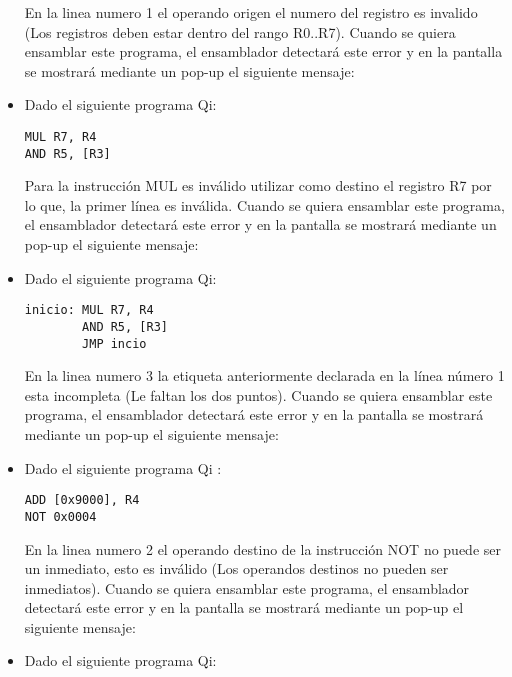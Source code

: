 \begin{itemize}
En la linea numero 1 el operando origen el numero del registro es invalido (Los registros deben estar dentro del rango R0..R7). Cuando se quiera ensamblar este programa, el ensamblador detectará este error y en la pantalla se mostrará mediante un pop-up el siguiente mensaje:


\item Dado el siguiente programa Qi:

\begin{verbatim}
MUL R7, R4
AND R5, [R3]
\end{verbatim}

Para la instrucción MUL es inválido utilizar como destino el registro R7 por lo que, la primer línea es inválida. Cuando se quiera ensamblar este programa, el ensamblador detectará este error y en la pantalla se mostrará mediante un pop-up el siguiente mensaje:


\item Dado el siguiente programa Qi:

\begin{verbatim}
inicio: MUL R7, R4
        AND R5, [R3]
        JMP incio
\end{verbatim}

En la linea numero 3 la etiqueta anteriormente declarada en la línea número 1 esta incompleta (Le faltan los dos puntos). Cuando se quiera ensamblar este programa, el ensamblador detectará este error y en la pantalla se mostrará mediante un pop-up el siguiente mensaje:



\item Dado el siguiente programa Qi :

\begin{verbatim}
ADD [0x9000], R4
NOT 0x0004
\end{verbatim}

En la linea numero 2 el operando destino de la instrucción NOT no puede ser un inmediato, esto es inválido (Los operandos destinos no pueden ser inmediatos). Cuando se quiera ensamblar este programa, el ensamblador detectará este error y en la pantalla se mostrará mediante un pop-up el siguiente mensaje:


\item Dado el siguiente programa Qi:


\end{itemize}
